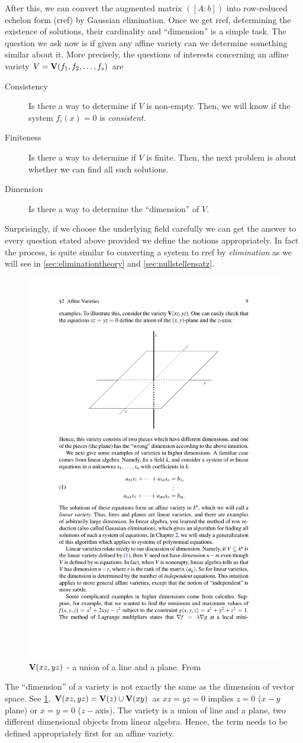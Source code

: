\documentclass[a4paper,11pt]{article}
\begin{document}
After this, we can convert the augmented matrix $([A:b])$ into row-reduced echelon form (rref) by Gaussian elimination. Once we get rref, determining the existence of solutions, their cardinality and ``dimension'' is a simple task.  The question we ask now is if given any affine variety can we determine something similar about it.
More precisely, the questions of interests concerning an affine variety $V=\textbf{V}(f_1,f_2,\ldots,f_{s})$ are
\begin{description}
    \item[Consistency] Is there a way to determine if $V$ is non-empty. Then, we will know if the system $f_i(x)=0$ is \emph{consistent}.
    \item[Finiteness] Is there a way to determine if $V$ is finite. Then, the next problem is about whether we can find all such solutions.
    \item[Dimension] Is there a way to determine the ``dimension'' of $V$.
\end{description}
Surprisingly, if we choose the underlying field carefully we can get the answer to every question stated above provided we define the notions appropriately. In fact the process, is quite similar to converting a system to rref by \emph{elimination} as we will see in \ref{sec:eliminationtheory} and \ref{sec:nullstellensatz}.
\begin{figure}[!hbt]
    \centering
    \includegraphics[width=0.4\linewidth]{Images/variety_dim.pdf}
    \caption{$\textbf{V}(xz,yz)$ - a union of a line and a plane. From \cite{book:coxlittleoshea}}
    \label{fig:variety_dim}
\end{figure}
\begin{note}
    The ``dimension'' of a variety is not exactly the same as the dimension of vector space. See \ref{fig:variety_dim}, $\textbf{V}(xz,yz)=\textbf{V}(z)\cup\textbf{V}(xy)$ as $xz=yz=0$ implies $z=0$ ($x-y$ plane) or $x=y=0$ ($z-$axis). The variety is a union of line and a plane, two different dimensional objects from linear algebra. Hence, the term needs to be defined appropriately first for an affine variety.
\end{note}
\end{document}
